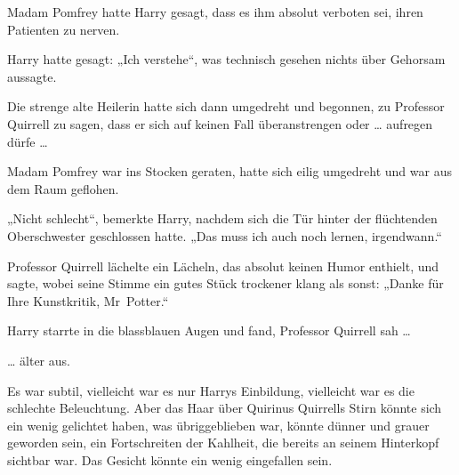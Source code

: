Madam Pomfrey hatte Harry gesagt, dass es ihm absolut verboten sei, ihren Patienten zu nerven.

Harry hatte gesagt:
„Ich verstehe“, was technisch gesehen nichts über Gehorsam aussagte.

Die strenge alte Heilerin hatte sich dann umgedreht und begonnen, zu Professor Quirrell zu sagen, dass er sich auf keinen Fall überanstrengen oder … aufregen dürfe …

Madam Pomfrey war ins Stocken geraten, hatte sich eilig umgedreht und war aus dem Raum geflohen.

„Nicht schlecht“, bemerkte Harry, nachdem sich die Tür hinter der flüchtenden Oberschwester geschlossen hatte.
„Das muss ich auch noch lernen, irgendwann.“

Professor Quirrell lächelte ein Lächeln, das absolut keinen Humor enthielt, und sagte, wobei seine Stimme ein gutes Stück trockener klang als sonst:
„Danke für Ihre Kunstkritik, Mr~Potter.“

Harry starrte in die blassblauen Augen und fand, Professor Quirrell sah …

… älter aus.

Es war subtil, vielleicht war es nur Harrys Einbildung, vielleicht war es die schlechte Beleuchtung. Aber das Haar über Quirinus Quirrells Stirn könnte sich ein wenig gelichtet haben, was übriggeblieben war, könnte dünner und grauer geworden sein, ein Fortschreiten der Kahlheit, die bereits an seinem Hinterkopf sichtbar war. Das Gesicht könnte ein wenig eingefallen sein.

